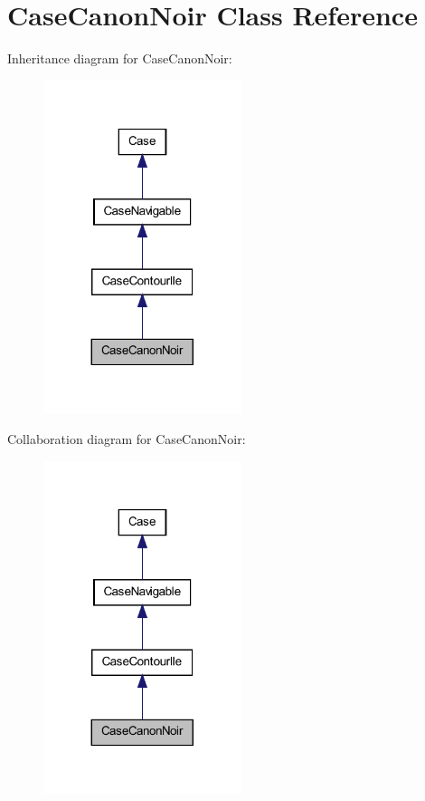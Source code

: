 \hypertarget{class_case_canon_noir}{
\section{CaseCanonNoir Class Reference}
\label{class_case_canon_noir}
}


Inheritance diagram for CaseCanonNoir:
\nopagebreak
\begin{figure}[H]
\begin{center}
\leavevmode
\includegraphics[width=164pt]{class_case_canon_noir__inherit__graph}
\end{center}
\end{figure}


Collaboration diagram for CaseCanonNoir:
\nopagebreak
\begin{figure}[H]
\begin{center}
\leavevmode
\includegraphics[width=164pt]{class_case_canon_noir__coll__graph}
\end{center}
\end{figure}
